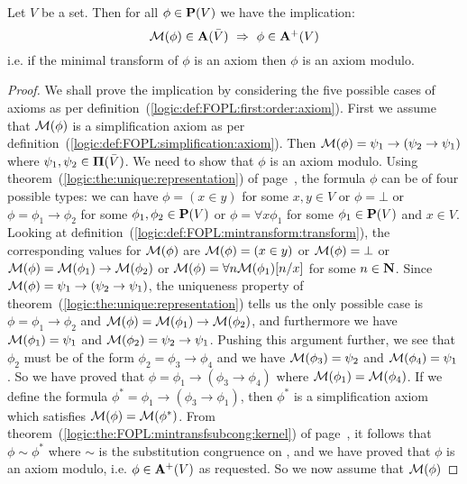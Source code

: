 \begin{lemma}\label{logic:lemma:FUAP:valsubaxmodulo:m:phi:phi}
Let $V$ be a set. Then for all $\phi\in\mbox{${\bf P}(V)$}$ we have the implication:
    \[
    {\cal M}(\phi)\in{\bf A}(\bar{V})\ \Rightarrow\ \phi\in\mbox{${\bf A}^{+}(V)$}
    \]
i.e. if the minimal transform of $\phi$ is an axiom then $\phi$ is
an axiom modulo.
\end{lemma}
\begin{proof}
We shall prove the implication by considering the five possible
cases of axioms as per
definition~(\ref{logic:def:FOPL:first:order:axiom}). First we assume
that ${\cal M}(\phi)$ is a simplification axiom as per
definition~(\ref{logic:def:FOPL:simplification:axiom}). Then ${\cal
M}(\phi)=\psi_{1}\to(\psi_{2}\to\psi_{1})$ where
$\psi_{1},\psi_{2}\in\mbox{${\bf\Pi}(\bar{V})$}$. We need to show that $\phi$ is an axiom
modulo. Using theorem~(\ref{logic:the:unique:representation}) of
page~\pageref{logic:the:unique:representation}, the formula $\phi$
can be of four possible types: we can have $\phi=(x\in y)$ for some
$x,y\in V$ or $\phi=\bot$ or $\phi=\phi_{1}\to\phi_{2}$ for some
$\phi_{1},\phi_{2}\in\mbox{${\bf P}(V)$}$ or $\phi=\forall x\phi_{1}$ for some
$\phi_{1}\in\mbox{${\bf P}(V)$}$ and $x\in V$. Looking at
definition~(\ref{logic:def:FOPL:mintransform:transform}), the
corresponding values for ${\cal M}(\phi)$ are ${\cal M}(\phi)=(x\in
y)$ or ${\cal M}(\phi)=\bot$ or ${\cal M}(\phi)={\cal
M}(\phi_{1})\to{\cal M}(\phi_{2})$ or ${\cal M}(\phi)=\forall n{\cal
M}(\phi_{1})[n/x]$ for some $n\in\mbox{$\bf N$}$. Since ${\cal
M}(\phi)=\psi_{1}\to(\psi_{2}\to\psi_{1})$, the uniqueness property
of theorem~(\ref{logic:the:unique:representation}) tells us the only
possible case is $\phi=\phi_{1}\to\phi_{2}$ and ${\cal
M}(\phi)={\cal M}(\phi_{1})\to{\cal M}(\phi_{2})$, and furthermore
we have ${\cal M}(\phi_{1})=\psi_{1}$ and ${\cal
M}(\phi_{2})=\psi_{2}\to\psi_{1}$. Pushing this argument further, we
see that $\phi_{2}$ must be of the form
$\phi_{2}=\phi_{3}\to\phi_{4}$ and we have ${\cal
M}(\phi_{3})=\psi_{2}$ and ${\cal M}(\phi_{4})=\psi_{1}$. So we have
proved that $\phi=\phi_{1}\to(\phi_{3}\to\phi_{4})$ where ${\cal
M}(\phi_{1})={\cal M}(\phi_{4})$. If we define the formula
$\phi^{*}=\phi_{1}\to(\phi_{3}\to\phi_{1})$, then $\phi^{*}$ is a
simplification axiom which satisfies ${\cal M}(\phi)={\cal
M}(\phi^{*})$. From
theorem~(\ref{logic:the:FOPL:mintransfsubcong:kernel}) of
page~\pageref{logic:the:FOPL:mintransfsubcong:kernel}, it follows
that $\phi\sim\phi^{*}$ where $\sim$ is the substitution congruence
on \pv, and we have proved that $\phi$ is an axiom modulo, i.e.
$\phi\in\mbox{${\bf A}^{+}(V)$}$ as requested. So we now assume that ${\cal M}(\phi)$

\end{proof}
